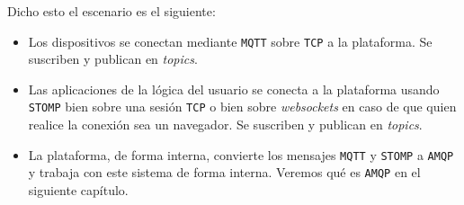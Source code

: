 Dicho esto el escenario es el siguiente:

\begin{itemize}\itemsep1pt \parskip0pt 
\item Los dispositivos se conectan mediante \texttt{MQTT} sobre \texttt{TCP} a
la plataforma. Se suscriben y publican en \emph{topics}.
\item Las aplicaciones de la lógica del usuario se conecta a la plataforma usando
\texttt{STOMP} bien sobre una sesión \texttt{TCP} o bien sobre \emph{websockets}
en caso de que quien realice la conexión sea un navegador. Se suscriben y publican
en \emph{topics}.
\item La plataforma, de forma interna, convierte los mensajes \texttt{MQTT} y
\texttt{STOMP} a \texttt{AMQP} y trabaja con este sistema de forma interna.
Veremos qué es \texttt{AMQP} en el siguiente capítulo.
\end{itemize}
